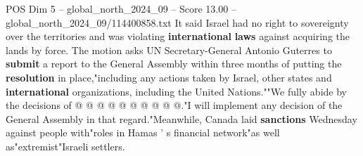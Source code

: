 \begin{textsample}{POS Dim 5 – global\_north\_2024\_09 – Score 13.00 – global\_north\_2024\_09/114400858.txt}
It said Israel had no right to sovereignty over the territories and was violating \textbf{international} \textbf{laws} against acquiring the lands by force.
The motion asks UN Secretary-General Antonio Guterres to \textbf{submit} a report to the General Assembly within three months of putting the \textbf{resolution} in place,"including any actions taken by Israel, other states and \textbf{international} organizations, including the United Nations.""We fully abide by the decisions of @ @ @ @ @ @ @ @ @ @."I will implement any decision of the General Assembly in that regard."Meanwhile, Canada laid \textbf{sanctions} Wednesday against people with"roles in Hamas ' s financial network"as well as"extremist"Israeli settlers.

\end{textsample}
